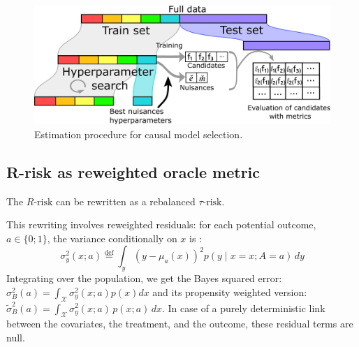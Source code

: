 \documentclass[a4paper,num-refs]{oup-contemporary}%
\begin{document}
\begin{figure}[h!]

    \centering\begin{minipage}{.95\linewidth}
        \includegraphics[width=\linewidth]{estimation_procedure_causal_selection_procedure.png}
    \end{minipage}
    \caption{Estimation procedure for causal model
        selection.}\label{problem:estimation_procedure:figure}
\end{figure}



\subsection{R-risk as reweighted oracle metric}\label{theory:r_risk_rewrite}

The $R\text{-risk}$ can be rewritten as a rebalanced $\tau \text{-risk}$.


This rewriting involves reweighted residuals: for each potential outcome, $a \in
    \{0; 1\}$, the variance conditionally on $x$ is \cite{shalit_estimating_2017}:
\begin{equation*}\label{eq:residuals}
    \sigma_{y}^{2}(x ; a) \overset{\text{def}}{=}
    \int_{y}\left(y-\mu_{a}(x)\right)^{2} p(y \mid x=x ; A=a) \, d y
\end{equation*}
Integrating over the population, we get the Bayes squared error:
$\sigma^2_{B}(a) = \int_{\mathcal X} \sigma_y^2(x;a) p(x)dx$
and its propensity weighted version:
$\tilde{\sigma}^2_{B}(a) = \int_{\mathcal X}\sigma_y^2(x;a)\,  p(x;
    a)\,dx$. In case of a purely deterministic link between the
covariates, the treatment, and the outcome, these residual terms are null.

\end{document}
